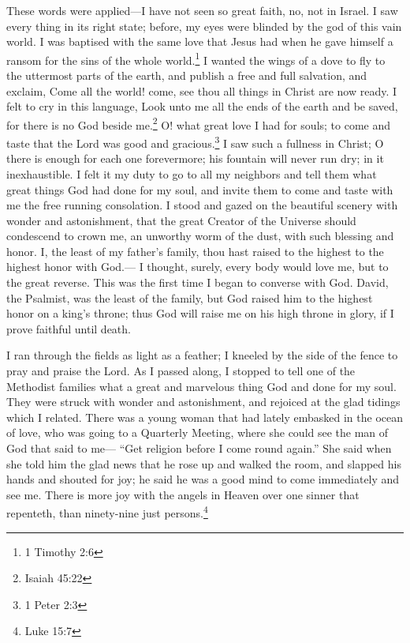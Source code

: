 These words were applied---I have not seen so great faith, no, not in Israel.
I saw every thing in its right state; before, my eyes were blinded by the god of this vain world.
I was baptised with the same love that Jesus had when he gave himself a ransom for the sins of the whole world.\footnote{1 Timothy 2:6}
I wanted the wings of a dove to fly to the uttermost parts of the earth, and publish a free and full salvation, and exclaim, Come all the world! come, see thou all things in Christ are now ready.
I felt to cry in this language, Look unto me all the ends of the earth and be saved, for there is no God beside me.\footnote{Isaiah 45:22}
O! what great love I had for souls; to come and taste that the Lord was good and gracious.\footnote{1 Peter 2:3}
I saw such a fullness in Christ; O there is enough for each one forevermore; his fountain will never run dry; in it inexhaustible.
I felt it my duty to go to all my neighbors and tell them what great things God had done for my soul, and invite them to come and taste with me the free running consolation.
I stood and gazed on the beautiful scenery with wonder and astonishment, that the great Creator of the Universe should condescend to crown me, an unworthy worm of the dust, with such blessing and honor.
I, the least of my father's family, thou hast raised to the highest to the highest honor with God.---%
I thought, surely, every body would love me, but to the great reverse.
This was the first time I began to converse with God.
David, the Psalmist, was the least of the family, but God raised him to the highest honor on a king's throne; thus God will raise me on his high throne in glory, if I prove faithful until death.

I ran through the fields as light as a feather; I kneeled by the side of the fence to pray and praise the Lord.
As I passed along, I stopped to tell one of the Methodist families what a great and marvelous thing God and done for my soul.
They were struck with wonder and astonishment, and rejoiced at the glad tidings which I related.
There was a young woman that had lately embasked in the ocean of love, who was going to a Quarterly Meeting, where she could see the man of God that said to me---%
\markpage%
``Get religion before I come round again.''
She said when she told him the glad news that he rose up and walked the room, and slapped his hands and shouted for joy; he said he was a good mind to come immediately and see me.
There is more joy with the angels in Heaven over one sinner that repenteth, than ninety-nine just persons.\footnote{Luke 15:7}

